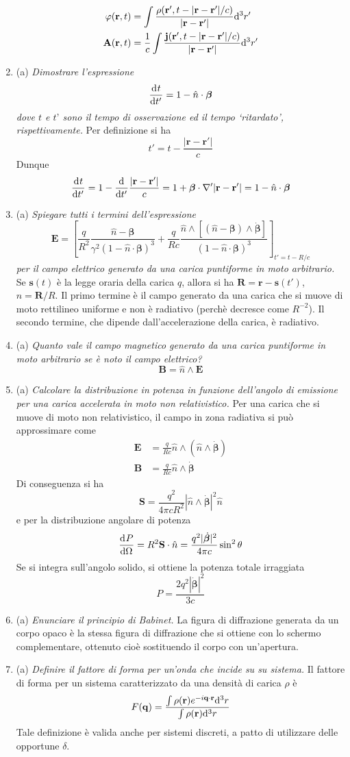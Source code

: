 \documentclass{article}
\renewcommand{\a}{(a)}
\renewcommand{\t}[1]{\textit{ #1}}
\renewcommand{\vec}[1]{\mathbf{#1}}
\begin{document}
\begin{enumerate}
	\begin{align*}
		\varphi(\vec{r},t)&=\int\frac{\rho(\vec{r}',t-|\vec{r}-\vec{r}'|/c)}{|\vec{r}-\vec{r}'|}\d ^3r'\\
		\vec{A}(\vec{r},t)&=\frac{1}{c}\int\frac{\vec{j}(\vec{r}',t-|\vec{r}-\vec{r}'|/c)}{|\vec{r}-\vec{r}'|}\d ^3r'
	\end{align*}
	\item\a\t{Dimostrare l’espressione \[\dfrac{\mathrm{d} ^{}t}{\mathrm{d} {t'}^{}}=1-\hat{n}\cdot\bm{\beta}\]
		dove $t$ e $t’$ sono il tempo di osservazione ed
		il tempo ‘ritardato’, rispettivamente.}
	Per definizione si ha
	\[t'=t-\frac{|\vec{r}-\vec{r}'|}{c}\]
	Dunque
	\[\der{t}{t'}=1-\der{}{t'}\frac{|\vec{r}-\vec{r}'|}{c}=1+\bm{\beta}\cdot\nabla'|\vec{r}-\vec{r}'|=1-\hat{n}\cdot\bm{\beta}\]
	\item\a\t{Spiegare tutti i termini dell’espressione 
		\[\vec{E}=\left[\frac{q}{R^2}\frac{\hat{n}-\bm{\beta}}{\gamma^2(1-\hat{n}\cdot\bm{\beta})^3}+\frac{q}{Rc}\frac{\hat{n}\wedge[(\hat{n}-\bm{\beta})\wedge\dot{\bm{\beta}}]}{(1-\hat{n}\cdot\bm{\beta})^3}\right]_{t'=t-R/c}\]
		per il
		campo elettrico generato da una carica puntiforme in moto arbitrario.}
	Se $\vec{s}(t)$ è la legge oraria della carica $q$, allora si ha $\vec{R}=\vec{r}-\vec{s}(t')$, $\hat{n}=\vec{R}/R$. Il primo termine è il campo generato da una carica che si muove di moto rettilineo uniforme e non è radiativo (perchè decresce come $R^{-2}$). Il secondo termine, che dipende dall'accelerazione della carica, è radiativo.
	\item\a\t{Quanto vale il campo magnetico generato da una carica puntiforme in moto
		arbitrario se è noto il campo elettrico?}
	\[\vec{B}=\hat{n}\wedge\vec{E}\]
	\item\a\t{Calcolare la distribuzione in potenza in funzione dell’angolo di emissione per una
		carica accelerata in moto non relativistico.}
	Per una carica che si muove di moto non relativistico, il campo in zona radiativa si può approssimare come
	\begin{align*}\vec{E}&=\frac{q}{Rc}\hat{n}\wedge(\hat{n}\wedge\dot{\bm{\beta}})\\\vec{B}&=\frac{q}{Rc}\hat{n}\wedge\dot{\bm{\beta}}\end{align*}
	Di conseguenza si ha
	\[\vec{S}=\frac{q^2}{4\pi cR^2}|\hat{n}\wedge\dot{\bm{\beta}}|^2\hat{n}\]
	e per la distribuzione angolare di potenza
	\[\der{P}{\Omega}=R^2\vec{S}\cdot\hat{n}=\frac{q^2|\dot{\bm{\beta}}|^2}{4\pi c}\sin^2\theta\]
	Se si integra sull'angolo solido, si ottiene la potenza totale irraggiata
	\[P=\frac{2q^2|\dot{\bm{\beta}}|^2}{3c}\]
	\item\a\t{Enunciare il principio di Babinet.} La figura di diffrazione generata da un corpo opaco è la stessa figura di diffrazione che si ottiene con lo schermo complementare, ottenuto cioè sostituendo il corpo con un'apertura.
	\item\a\t{Definire il fattore di forma per un'onda che incide su su sistema.}
	Il fattore di forma per un sistema caratterizzato da una densità di carica $\rho$ è
	\[F(\vec{q})=\frac{\int \rho(\vec{r})e^{-i\vec{q}\cdot\vec{r}}\d ^3r}{\int\rho(\vec{r})\d ^3r}\]
	Tale definizione è valida anche per sistemi discreti, a patto di utilizzare delle opportune $\delta$.
	

\end{enumerate}
\end{document}
